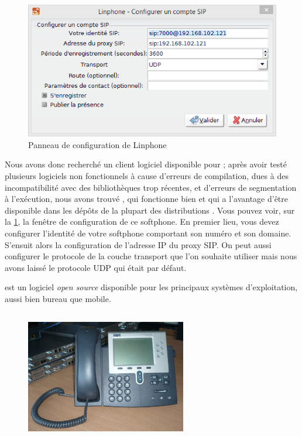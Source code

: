\subsection{\lnp}

\begin{figure}[h]
\begin{center}
\includegraphics[width=12cm]{images/config-linphone.png}
\end{center}
\caption{Panneau de configuration de Linphone}
\label{conflinphone}
\end{figure}

Nous avons donc recherché un client logiciel disponible pour {\lnx} ; après avoir testé plusieurs logiciels non fonctionnels à cause d’erreurs de compilation, dues à des incompatibilité avec des bibliothèques trop récentes, et d’erreurs de segmentation à l’exécution, nous avons trouvé {\lnp}, qui fonctionne bien et qui a l’avantage d’être disponible dans les dépôts de la plupart des distributions {\lnx}.
Vous pouvez voir, sur la \cref{conflinphone}, la fenêtre de configuration de ce softphone. En premier lieu, vous devez configurer l'identité de votre softphone comportant son numéro et son domaine. S'ensuit alors la configuration de l'adresse IP du proxy SIP. On peut aussi configurer le protocole de la couche transport que l'on souhaite utiliser mais nous avons laissé le protocole UDP qui était par défaut.  

{\lnp} est un logiciel \textit{open source} disponible pour les principaux systèmes d’exploitation, aussi bien bureau que mobile.

\subsection{\cph}

\begin{figure}[H]
\begin{center}
\includegraphics[width=7cm]{images/7961.jpg}
\end{center}
\caption{\cph}
\end{figure}

